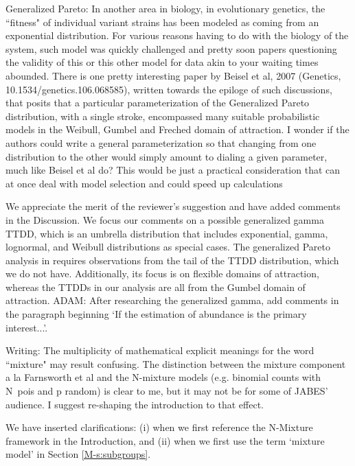 \documentclass[12pt]{article}
\renewenvironment{quote}  %
              {\list{}{\rightmargin\leftmargin}\normalfont%
               \item\relax}
              {\endlist}
\newcommand{\adam}[1]{{\color{blue} ADAM: #1}}
\begin{document}
Generalized Pareto: In another area in biology, in evolutionary genetics, the ``fitness" of individual variant strains has been modeled as coming from an exponential distribution.  For various reasons having to do with the biology of the system, such model was quickly challenged and pretty soon papers questioning the validity of this or this other model for data akin to your waiting times abounded. There is one pretty interesting paper by Beisel et al, 2007 (Genetics, 10.1534/genetics.106.068585), written towards the epiloge of such discussions, that posits that a particular parameterization of the Generalized Pareto distribution, with a single stroke, encompassed many suitable probabilistic models in the Weibull, Gumbel and Freched domain of attraction.  I wonder if the authors could write a general parameterization so that changing from one distribution to the other would simply amount to dialing a given parameter, much like Beisel et al do?  This would be just a practical
consideration that can at once deal with model selection and could speed up calculations
\begin{quote}
We appreciate the merit of the reviewer's suggestion and have added comments in the Discussion.
We focus our comments on a possible generalized gamma TTDD, which is an umbrella distribution that includes exponential, gamma, lognormal, and Weibull distributions as special cases.
The generalized Pareto analysis in \citet{Beisel2007} requires observations from the tail of the TTDD distribution, which we do not have.
Additionally, its focus is on flexible domains of attraction, whereas the TTDDs in our analysis are all from the Gumbel domain of attraction.
\adam{After researching the generalized gamma, add comments in the paragraph beginning `If the estimation of abundance is the primary interest...'.}
\end{quote}

Writing: The multiplicity of mathematical explicit meanings for the word ``mixture" may result confusing. The distinction between the mixture component a la Farnsworth et al and the N-mixture models (e.g. binomial counts with N~pois and p random) is clear to me, but it may not be for some of JABES' audience.  I suggest re-shaping the introduction to that effect. 
\begin{quote}
We have inserted clarifications: (i) when we first reference the N-Mixture framework in the Introduction, and (ii) when we first use the term `mixture model' in Section \ref{M-s:subgroups}.
\end{quote}
\end{document}
